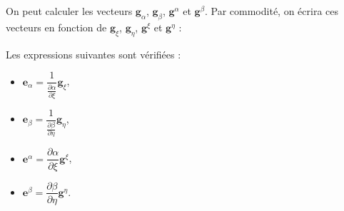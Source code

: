 On peut calculer les vecteurs $\mathbf{g}_{\alpha}$, $\mathbf{g}_{\beta}$, $\mathbf{g}^{\alpha}$ et $\mathbf{g}^{\beta}$. Par commodité, on écrira ces vecteurs en fonction de $\mathbf{g}_{\xi}$, $\mathbf{g}_{\eta}$, $\mathbf{g}^{\xi}$ et $\mathbf{g}^{\eta}$ :

\begin{proposition}
Les expressions suivantes sont vérifiées :
\begin{itemize}
\item $\mathbf{e}_{\alpha} = \dfrac{1}{\frac{\partial \alpha}{\partial \xi}} \mathbf{g}_{\xi}$,
\item $\mathbf{e}_{\beta} = \dfrac{1}{\frac{\partial \beta}{\partial \eta}} \mathbf{g}_{\eta}$,
\item $\mathbf{e}^{\alpha} = \dfrac{\partial \alpha}{\partial \xi} \mathbf{g}^{\xi}$,
\item $\mathbf{e}^{\beta} = \dfrac{\partial \beta}{\partial \eta} \mathbf{g}^{\eta}$.
\end{itemize}
\label{prop: g_alpha g_beta fct de g_xi g_eta}
\end{proposition}

